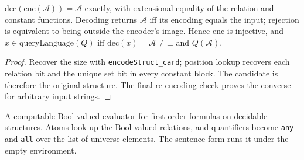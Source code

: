 \begin{theorem}
  \label{thm:desc-encoding-roundtrip}
  \leanok
  $\mathrm{dec}(\mathrm{enc}(\mathcal{A})) = \mathcal{A}$ exactly, with
  extensional equality of the relation and constant functions.
  Decoding returns $\mathcal{A}$ iff its encoding equals the input; rejection
  is equivalent to being outside the encoder's image. Hence $\mathrm{enc}$ is injective, and
  $x \in \mathrm{queryLanguage}(Q)$ iff $\mathrm{dec}(x) = \mathcal{A} \neq \bot$
  and $Q(\mathcal{A})$.
\end{theorem}
\begin{proof}
  \leanok
  Recover the size with \texttt{encodeStruct\_card}; position lookup recovers
  each relation bit and the unique set bit in every constant block. The candidate
  is therefore the original structure. The final re-encoding check proves the
  converse for arbitrary input strings.
\end{proof}

\begin{definition}
  \label{def:desc-model-checking}
  \leanok
  A computable $\mathrm{Bool}$-valued evaluator for first-order formulas on
  decidable structures. Atoms look up the $\mathrm{Bool}$-valued relations, and
  quantifiers become \texttt{any} and \texttt{all} over the list of universe
  elements. The sentence form runs it under the empty environment.
\end{definition}

